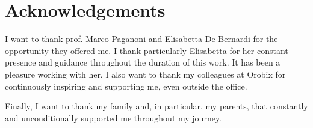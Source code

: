 \documentclass[a4paper,12pt,margin=1in]{book}
\begin{document}
\mainmatter

\chapter*{Acknowledgements}

\thispagestyle{empty}

I want to thank prof. Marco Paganoni and Elisabetta De Bernardi for the opportunity they offered me. I thank particularly Elisabetta for her constant presence and guidance throughout the duration of this work. It has been a pleasure working with her. I also want to thank my colleagues at Orobix for continuously inspiring and supporting me, even outside the office.

Finally, I want to thank my family and, in particular, my parents, that constantly and unconditionally supported me throughout my journey.

\newpage\thispagestyle{empty}


\tableofcontents









\backmatter

\printbibliography
\end{document}
